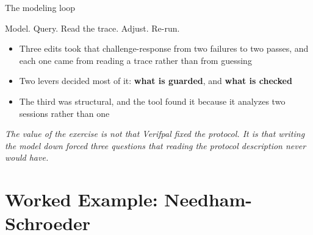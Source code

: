 \ifdefined\PRESENTATION\else\PassOptionsToClass{handout}{beamer}\fi\documentclass[aspectratio=169, lualatex]{beamer}
\begin{document}
\begin{frame}{The modeling loop}
	\begin{center}
		\Large
		Model. Query. Read the trace. Adjust. Re-run.
	\end{center}
	\vspace{0.7em}
	\begin{itemize}
		\item Three edits took that challenge-response from two failures to two passes, and each one came from reading a trace rather than from guessing
		\item Two levers decided most of it: \textbf{what is guarded}, and \textbf{what is checked}
		\item The third was structural, and the tool found it because it analyzes two sessions rather than one
	\end{itemize}
	\vspace{0.7em}
	\begin{center}
		\textit{The value of the exercise is not that Verifpal fixed the protocol. It is that writing the model down forced three questions that reading the protocol description never would have.}
	\end{center}
\end{frame}

\section{Worked Example: Needham-Schroeder}
\end{document}
